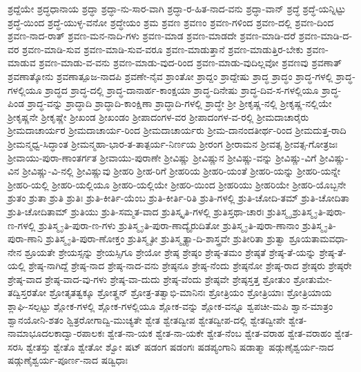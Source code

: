 {ಶ್ರದ್ದೆಯೇ
ಶ್ರದ್ಧಧಾನಾಯ
ಶ್ರದ್ಧಾ
ಶ್ರದ್ಧಾ-ನು-ಸಾರ-ವಾಗಿ
ಶ್ರದ್ಧಾ-ರ-ಹಿತ-ನಾದ-ವನು
ಶ್ರದ್ಧಾ-ವಾನ್
ಶ್ರದ್ಧೆ
ಶ್ರದ್ಧೆ-ಯನ್ನಿಟ್ಟು
ಶ್ರದ್ಧೆ-ಯಿಂದ
ಶ್ರದ್ಧೆ-ಯುಳ್ಳ-ವನೋ
ಶ್ರದ್ಧೇಯಂ
ಶ್ರಮ
ಶ್ರವಣ
ಶ್ರವಣಂ
ಶ್ರವಣ-ಗಳಿಂದ
ಶ್ರವಣ-ದಲ್ಲಿ
ಶ್ರವಣ-ದಿಂದ
ಶ್ರವಣ-ನಾದ-ರಾತ್
ಶ್ರವಣ-ಮನ-ನಾದಿ-ಗಳು
ಶ್ರವಣ-ಮಾಡ
ಶ್ರವಣ-ಮಾಡದೇ
ಶ್ರವಣ-ಮಾಡಿ-ದರೆ
ಶ್ರವಣ-ಮಾಡಿ-ದ-ವರ
ಶ್ರವಣ-ಮಾಡಿ-ಸುವ
ಶ್ರವಣ-ಮಾಡಿ-ಸುವ-ವರೂ
ಶ್ರವಣ-ಮಾಡುತ್ತಾನೆ
ಶ್ರವಣ-ಮಾಡುತ್ತಿರ-ಬೇಕು
ಶ್ರವಣ-ಮಾಡುವ
ಶ್ರವಣ-ಮಾಡು-ವ-ವನು
ಶ್ರವಣ-ಮಾಡು-ವುದ-ರಿಂದ
ಶ್ರವಣ-ಮಾಡು-ವುದಿಲ್ಲವೋ
ಶ್ರವಣವು
ಶ್ರವಣಾತ್
ಶ್ರವಣಾತ್ಕೋನು
ಶ್ರವಣಾತ್ಪೂಜ-ನಾದಪಿ
ಶ್ರವಣೇ-ನೈವ
ಶ್ರಾಂತೋ
ಶ್ರಾದ್ದಂ
ಶ್ರಾದ್ದೇಷು
ಶ್ರಾದ್ಧ
ಶ್ರಾದ್ಧಂ
ಶ್ರಾದ್ಧ-ಗಳಲ್ಲಿ
ಶ್ರಾದ್ಧ-ಗಳಲ್ಲಿಯೂ
ಶ್ರಾದ್ಧದ
ಶ್ರಾದ್ಧ-ದಲ್ಲಿ
ಶ್ರಾದ್ಧ-ದಾನಾರ್ಹ-ಕಾಂಕ್ಷಯಾ
ಶ್ರಾದ್ಧ-ದಿನೇಷು
ಶ್ರಾದ್ಧ-ದಿವ-ಸ-ಗಳಲ್ಲಿಯೂ
ಶ್ರಾದ್ಧ-ಪಿಂಡ
ಶ್ರಾದ್ಧ-ವನ್ನು
ಶ್ರಾದ್ಧಾದಿ
ಶ್ರಾದ್ಧಾದಿ-ಕಾಂಕ್ಷಿಣಾ
ಶ್ರಾದ್ಧಾದಿ-ಗಳಲ್ಲಿ
ಶ್ರಾದ್ಧೇ
ಶ್ರೀ
ಶ್ರೀಕೃಷ್ಣ-ನಲ್ಲಿ
ಶ್ರೀಕೃಷ್ಣ-ನಲ್ಲಿಯೇ
ಶ್ರೀಕೃಷ್ಣನೇ
ಶ್ರೀಕೃಷ್ಣೇ
ಶ್ರೀಖಂಡ
ಶ್ರೀಖಂಡಂ
ಶ್ರೀಪಾದಂಗಳ-ವರ
ಶ್ರೀಪಾದಂಗಳ-ವ-ರಲ್ಲಿ
ಶ್ರೀಮದಾಚಾರೈರು
ಶ್ರೀಮದಾಚಾರ್ಯರ
ಶ್ರೀಮದಾಚಾರ್ಯ-ರಿಂದ
ಶ್ರೀಮದಾಚಾರ್ಯರು
ಶ್ರೀಮ-ದಾನಂದತೀರ್ಥ-ರಿಂದ
ಶ್ರೀಮದುತ್ತ-ರಾದಿ
ಶ್ರೀಮನ್ಮಧ್ವ-ಸಿದ್ಧಾಂತ
ಶ್ರೀಮನ್ಮಹಾ-ಭಾರ-ತ-ತಾತ್ಪರ್ಯ-ನಿರ್ಣಯ
ಶ್ರೀರಂಗ
ಶ್ರೀರಾಮನ
ಶ್ರೀವತ್ಸ
ಶ್ರೀವತ್ಸ-ಗೋತ್ರಜಃ
ಶ್ರೀವಾಯು-ಪುರಾ-ಣಾಂತರ್ಗತ
ಶ್ರೀವಾಯು-ಪುರಾಣೇ
ಶ್ರೀವಿಷ್ಣು
ಶ್ರೀವಿಷ್ಣುನ
ಶ್ರೀವಿಷ್ಣು-ವನ್ನು
ಶ್ರೀವಿಷ್ಣು-ವಿಗೆ
ಶ್ರೀವಿಷ್ಣು-ವಿನ
ಶ್ರೀವಿಷ್ಣು-ವಿ-ನಲ್ಲಿ
ಶ್ರೀವಿಷ್ಣುವು
ಶ್ರೀಹರಿ
ಶ್ರೀಹ-ರಿಗೆ
ಶ್ರೀಹರಿಯ
ಶ್ರೀಹರಿ-ಯಂತೆ
ಶ್ರೀಹರಿ-ಯನ್ನು
ಶ್ರೀಹರಿ-ಯನ್ನೇ
ಶ್ರೀಹರಿ-ಯಲ್ಲಿ
ಶ್ರೀಹರಿ-ಯಲ್ಲಿಯೂ
ಶ್ರೀಹರಿ-ಯಲ್ಲಿಯೇ
ಶ್ರೀಹರಿ-ಯಿಂದ
ಶ್ರೀಹರಿಯು
ಶ್ರೀಹರಿಯೇ
ಶ್ರೀಹರಿ-ಯೊಬ್ಬನೇ
ಶ್ರುತಂ
ಶ್ರುತಾ
ಶ್ರುತಿ
ಶ್ರುತಿಃ
ಶ್ರುತಿ-ಕೀರ್ತಿ-ಯೆಂಬ
ಶ್ರುತಿ-ಕೀರ್ತಿ-ರಿತಿ
ಶ್ರುತಿ-ಗಳಲ್ಲಿ
ಶ್ರುತಿ-ಚೋದಿ-ತಮ್
ಶ್ರುತಿ-ಚೋದಿತಾ
ಶ್ರುತಿ-ಚೋದಿತಾಮ್
ಶ್ರುತಿಯು
ಶ್ರುತಿ-ಸಮ್ಮತ-ವಾದ
ಶ್ರುತಿಸ್ಕೃತಿ-ಗಳಲ್ಲಿ
ಶ್ರುತಿಸ್ತಥಾ-ಚಾರಃ
ಶ್ರುತಿಸ್ಮೃ
ಶ್ರುತಿಸ್ಮೃ-ತಿ-ಪುರಾ-ಣ-ಗಳಲ್ಲಿ
ಶ್ರುತಿಸ್ಮೃ-ತಿ-ಪುರಾ-ಣ-ಗಳು
ಶ್ರುತಿಸ್ಮೃ-ತಿ-ಪುರಾ-ಣಾದ್ಯೈರುದಿತೋ
ಶ್ರುತಿಸ್ಮೃ-ತಿ-ಪುರಾ-ಣಾನಾಂ
ಶ್ರುತಿಸ್ಮೃ-ತಿ-ಪುರಾ-ಣಾನಿ
ಶ್ರುತಿಸ್ಮೃ-ತಿ-ಪುರಾ-ಣೋಕ್ತಂ
ಶ್ರುತಿಸ್ಮೃತೀ
ಶ್ರುತಿಸ್ಮೃತ್ಯಾ-ದಿ-ಶಾಸ್ತ್ರವೇ
ಶ್ರುತೀರಿತಾ
ಶ್ರುತ್ವಾ
ಶ್ರೂಯತಾಮವಧಾ-ನೇನ
ಶ್ರೂಯತೇ
ಶ್ರೇಯಸ್ಸನ್ನು
ಶ್ರೇಯಸ್ಸಿಗೂ
ಶ್ರೇಯೋ
ಶ್ರೇಷ್ಠ
ಶ್ರೇಷ್ಠಂ
ಶ್ರೇಷ್ಠ-ತಮಂ
ಶ್ರೇಷ್ಠತೆ
ಶ್ರೇಷ್ಠ-ತೆ-ಯನ್ನು
ಶ್ರೇಷ್ಠ-ತೆ-ಯಲ್ಲಿ
ಶ್ರೇಷ್ಠ-ನಾಗಿದ್ದೆ
ಶ್ರೇಷ್ಠ-ನಾದ
ಶ್ರೇಷ್ಠ-ನಾದ-ವನು
ಶ್ರೇಷ್ಠನೂ
ಶ್ರೇಷ್ಠ-ನೆಂದು
ಶ್ರೇಷ್ಠನೋ
ಶ್ರೇಷ್ಠ-ರಾದ
ಶ್ರೇಷ್ಠರು
ಶ್ರೇಷ್ಠರೇ
ಶ್ರೇಷ್ಠ-ವಾದ
ಶ್ರೇಷ್ಠ-ವಾದ-ವು-ಗಳು
ಶ್ರೇಷ್ಠ-ವಾ-ದುದು
ಶ್ರೇಷ್ಠ-ವೆಂದು
ಶ್ರೇಷ್ಠವೇ
ಶ್ರೇಷ್ಠಸ್ತತ್ತ
ಶ್ರೋತುಂ
ಶ್ರೋತುಮೇ-ತದ್ವಿಸ್ತರತೋ
ಶ್ರೋತೃತತ್ವಕ್ಕೂ
ಶ್ರೋತೄನ್
ಶ್ರೋತ್ರ-ತತ್ವಾಭಿ-ಮಾನಿನಃ
ಶ್ರೋತ್ರಿಯಂ
ಶ್ರೋತ್ರಿಯಾಃ
ಶ್ರೋತ್ರಿಯಾಯ
ಶ್ಲಾಘಿ-ಸಲ್ಪಟ್ಟು
ಶ್ಲೋಕ-ಗಳಲ್ಲಿ
ಶ್ಲೋಕ-ಗಳಲ್ಲಿಯೂ
ಶ್ಲೋಕ-ವನ್ನು
ಶ್ಲೋಕ-ವನ್ನೂ
ಶ್ವಪಚೀ-ಮಪಿ
ಶ್ವಾನ-ಮಾತ್ರಂ
ಶ್ವಾನಯೋನಿ-ಶತಂ
ಶ್ವಿತ್ರರೋಗಾದ್ವಿ-ಮುಚ್ಯತೇ
ಶ್ವೇತ
ಶ್ವೇತದ್ವೀಪ
ಶ್ವೇತದ್ವೀಪ-ದಲ್ಲಿ
ಶ್ವೇತದ್ವೀಪೇ
ಶ್ವೇತ-ನಾಮಾಭೂದಲಕಾದ್ವಾ-ರಪಾಲಕಃ
ಶ್ವೇತ-ನಾ-ಯಕ
ಶ್ವೇತ-ನಾ-ಯಕೇ
ಶ್ವೇತ-ನೆಂಬ
ಶ್ವೇತ-ವರಾಹ
ಶ್ವೇತ-ವರಾಹಂ
ಶ್ವೇತ-ಸರಸಿ
ಶ್ವೇತಸ್ತು
ಶ್ವೇತೊ
ಶ್ವೇತೋ
ಶ್ವೋ
ಷಟ್
ಷಡಂಗ
ಷಡಂಗಃ
ಷಡಪ್ಯಂಗಾನಿ
ಷಡಾತ್ಮಾ
ಷಡ್ಗುಣೈಶ್ವರ್ಯ-ನಾದ
ಷಡ್ಗುಣೈಶ್ವರ್ಯ-ಪೂರ್ಣ-ನಾದ
ಷಡ್ವಿಧಾಃ
}
